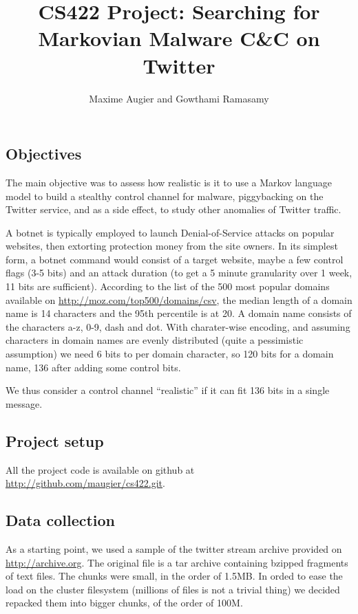 \documentclass[a4paper,11pt]{article}
\title{CS422 Project: Searching for Markovian Malware C\&C on Twitter}
\author{Maxime Augier and Gowthami Ramasamy}
\begin{document}
\maketitle


\subsection{Objectives}

The main objective was to assess how realistic is it to use a Markov language model to build a stealthy control channel for malware, piggybacking on the Twitter service, and as a side effect, to study other anomalies of Twitter traffic.

A botnet is typically employed to launch Denial-of-Service attacks on popular websites, then extorting protection money from the site
owners. In its simplest form, a botnet command would consist of a target website, maybe a few control flags (3-5 bits) and an attack duration (to get a 5 minute granularity over 1 week, 11 bits are sufficient). According to the list of the 500 most popular domains available on \url{http://moz.com/top500/domains/csv}, the median length of a domain name is 14 characters and the 95th percentile is at 20. A domain name consists of the characters a-z, 0-9, dash and dot. With charater-wise encoding, and assuming characters in domain names are evenly distributed (quite a pessimistic assumption) we need 6 bits to per domain character, so 120 bits for a domain name, 136 after adding some control bits.

We thus consider a control channel ``realistic'' if it can fit 136 bits in a single message.


\subsection{Project setup}

All the project code is available on github at \url{http://github.com/maugier/cs422.git}. 

\subsection{Data collection}

As a starting point, we used a sample of the twitter stream archive provided on \url{http://archive.org}. The original file is a tar archive containing bzipped fragments of text files. The chunks were small, in the order of 1.5MB. In orded to ease the load on the cluster filesystem (millions of files is not a trivial thing) we decided repacked them into bigger chunks, of the order of 100M.
\end{document}
